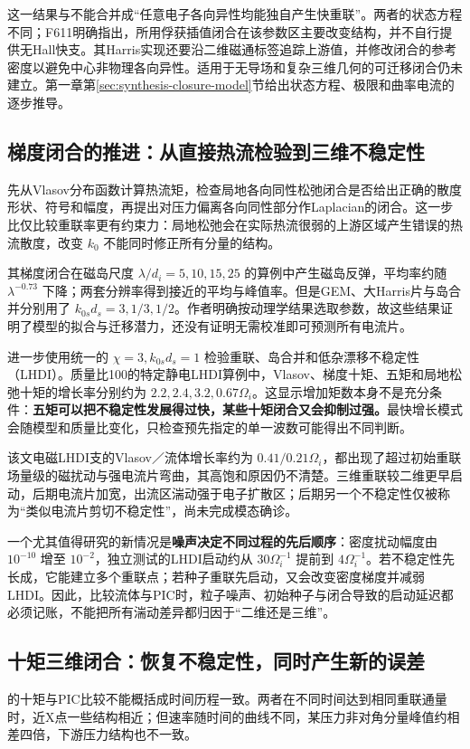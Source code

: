 这一结果与\citet{Cassak2015}不能合并成“任意电子各向异性均能独自产生快重联”。两者的状态方程不同；F611明确指出，所用俘获插值闭合在该参数区主要改变结构，并不自行提供无Hall快支。其Harris实现还要沿二维磁通标签追踪上游值，并修改闭合的参考密度以避免中心非物理各向异性。适用于无导场和复杂三维几何的可迁移闭合仍未建立。第一章第\ref{sec:synthesis-closure-model}节给出状态方程、极限和曲率电流的逐步推导。

\subsection{梯度闭合的推进：从直接热流检验到三维不稳定性}
\citet{L256}先从Vlasov分布函数计算热流矩，检查局地各向同性松弛闭合是否给出正确的散度形状、符号和幅度，再提出对压力偏离各向同性部分作Laplacian的闭合。这一步比仅比较重联率更有约束力：局地松弛会在实际热流很弱的上游区域产生错误的热流散度，改变 $k_0$ 不能同时修正所有分量的结构。

其梯度闭合在磁岛尺度 $\lambda/d_i=5,10,15,25$ 的算例中产生磁岛反弹，平均率约随 $\lambda^{-0.73}$ 下降；两套分辨率得到接近的平均与峰值率。但是GEM、大Harris片与岛合并分别用了 $k_{0s}d_s=3,1/3,1/2$。作者明确按动理学结果选取参数，故这些结果证明了模型的拟合与迁移潜力，还没有证明无需校准即可预测所有电流片。

\citet{E552}进一步使用统一的 $\chi=3,k_{0s}d_s=1$ 检验重联、岛合并和低杂漂移不稳定性（LHDI）。质量比100的特定静电LHDI算例中，Vlasov、梯度十矩、五矩和局地松弛十矩的增长率分别约为 $2.2,2.4,3.2,0.67\Omega_i$。这显示增加矩数本身不是充分条件：\textbf{五矩可以把不稳定性发展得过快，某些十矩闭合又会抑制过强。}最快增长模式会随模型和质量比变化，只检查预先指定的单一波数可能得出不同判断。

该文电磁LHDI支的Vlasov／流体增长率约为 $0.41/0.21\Omega_i$，都出现了超过初始重联场量级的磁扰动与强电流片弯曲，其高饱和原因仍不清楚。三维重联较二维更早启动，后期电流片加宽，出流区湍动强于电子扩散区；后期另一个不稳定性仅被称为“类似电流片剪切不稳定性”，尚未完成模态确诊。

一个尤其值得研究的新情况是\textbf{噪声决定不同过程的先后顺序}：密度扰动幅度由 $10^{-10}$ 增至 $10^{-2}$，独立测试的LHDI启动约从 $30\Omega_i^{-1}$ 提前到 $4\Omega_i^{-1}$。若不稳定性先长成，它能建立多个重联点；若种子重联先启动，又会改变密度梯度并减弱LHDI。因此，比较流体与PIC时，粒子噪声、初始种子与闭合导致的启动延迟都必须记账，不能把所有湍动差异都归因于“二维还是三维”。

\subsection{十矩三维闭合：恢复不稳定性，同时产生新的误差}
\citet{Wang2015}的十矩与PIC比较不能概括成时间历程一致。两者在不同时间达到相同重联通量时，近X点一些结构相近；但速率随时间的曲线不同，某压力非对角分量峰值约相差四倍，下游压力结构也不一致。

